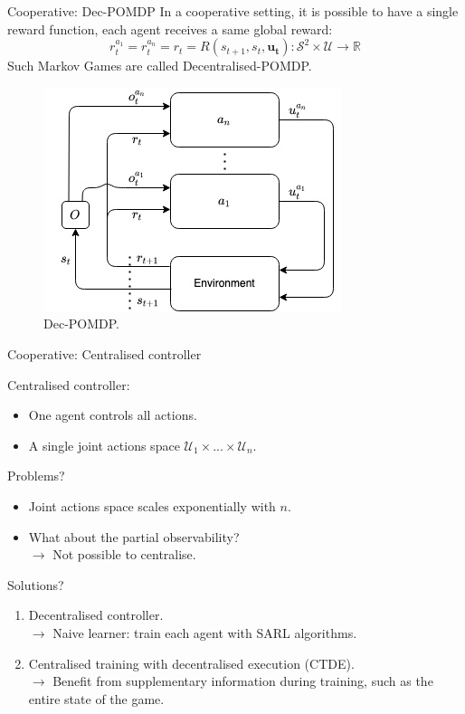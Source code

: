 \documentclass{beamer}
\begin{document}
\begin{frame}{Cooperative: Dec-POMDP}
In a cooperative setting, it is possible to have a single reward function, each agent receives a same global reward:
\begin{equation*}
    r^{a_1}_t = r^{a_n}_t=r_t = R(s_{t+1}, s_t, \boldsymbol{u_t}): \mathcal{S}^2 \times \mathcal{U} \rightarrow \mathbb{R}
\end{equation*}
Such Markov Games are called Decentralised-POMDP.
\begin{figure}
    \centering
    \includegraphics[scale=0.45]{dec-poMDP.png}
    \caption{Dec-POMDP.}

\end{figure}
\end{frame}



\begin{frame}{Cooperative: Centralised controller}
\vfill

Centralised controller:
        \begin{itemize}
            \item One agent controls all actions.
            \item A single joint actions space $\mathcal{U}_1 \times ... \times \mathcal{U}_n$.
        \end{itemize}
    \vfill
Problems?
    \pause
    \begin{itemize}
        \item Joint actions space scales exponentially with $n$.
        \item What about the partial observability?\\
        $\rightarrow$ Not possible to centralise.
    \end{itemize}
    \vfill
Solutions?
    \pause
    \begin{enumerate}
        \item Decentralised controller.\\
        $\rightarrow$ Naive learner: train each agent with SARL algorithms.
        \item Centralised training with decentralised execution (CTDE).\\
        $\rightarrow$ Benefit from supplementary information during training, such as the entire state of the game.
        \end{enumerate}

\end{frame}
\end{document}
